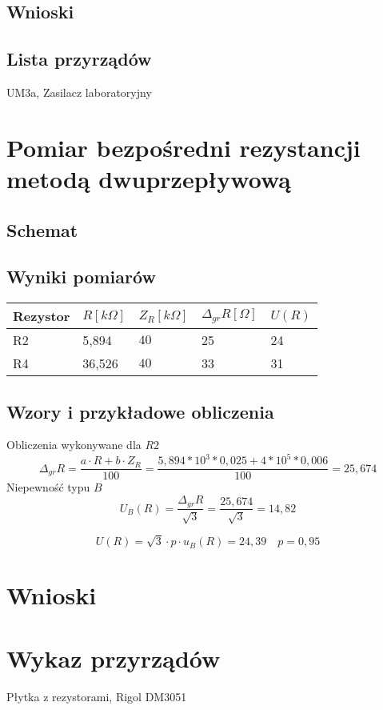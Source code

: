 \documentclass[11pt]{article}
\begin{document}
\subsection{Wnioski}

\subsection{Lista przyrządów}
UM3a, Zasilacz laboratoryjny

\section{Pomiar bezpośredni rezystancji metodą dwuprzepływową} 
\subsection{Schemat}
\subsection{Wyniki pomiarów}

\begin{tabular}{|l|l|l|l|l|}
\hline
	 Rezystor & $R[k\Omega]$ & $Z_R[k\Omega]$ & $\Delta_{gr}R [\Omega]$ & $U(R)$\\
\hline
	R2 & 5,894 & $40$ & 25 & 24\\
\hline
	R4 & 36,526 & $40$ & 33 & 31\\
\hline
\end{tabular}
\subsection{Wzory i przykładowe obliczenia}
Obliczenia wykonywane dla $R2$
$$\Delta_{gr}R = \frac{a \cdot R + b \cdot Z_R}{100} = 
	\frac{5,894 *10^3 * 0,025 + 4*10^5*0,006}{100} = 25,674$$
Niepewność typu $B$ 
$$ U_B(R) = \frac{\Delta_{gr}R}{\sqrt{3}} = \frac{25,674}{\sqrt{3}} = 14,82 $$

$$ U(R) = \sqrt{3} \cdot p \cdot u_B(R) = 24,39 \quad p = 0,95$$

\section{Wnioski}

\section{Wykaz przyrządów}
Płytka z rezystorami, Rigol DM3051
	
\end{document}
